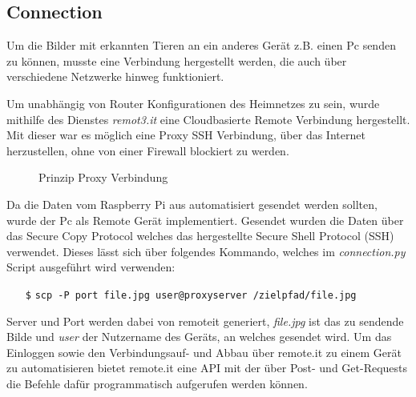 \subsection*{Connection}

Um die Bilder mit erkannten Tieren an ein anderes Gerät 
z.B. einen Pc senden zu können, musste eine Verbindung
hergestellt werden, die auch über verschiedene Netzwerke 
hinweg funktioniert.

Um unabhängig von Router Konfigurationen des Heimnetzes zu sein, 
wurde mithilfe des Dienstes \textit{remot3.it} \cite{remoteit}
eine Cloudbasierte Remote Verbindung hergestellt.
Mit dieser war es möglich eine Proxy SSH Verbindung, 
über das Internet herzustellen, ohne von einer Firewall 
blockiert zu werden.


\begin{figure}[H]
    \centering
    \def\svgwidth{0.7\textwidth}
    
    \caption{Prinzip Proxy Verbindung}
    \label{fig:remoteit}
\end{figure}

Da die Daten vom Raspberry Pi aus automatisiert gesendet 
werden sollten, wurde der Pc als Remote Gerät implementiert.
Gesendet wurden die Daten über das Secure Copy Protocol welches 
das hergestellte Secure Shell Protocol (SSH) verwendet.
Dieses lässt sich über folgendes Kommando,
welches im \textit{connection.py}
Script ausgeführt wird verwenden:
\begin{itemize}
    \item[\texttt{\$}] \texttt{scp -P port file.jpg user@proxyserver /zielpfad/file.jpg}
\end{itemize}

Server und Port werden dabei von remoteit generiert, \textit{file.jpg}
ist das zu sendende Bilde und \textit{user} der Nutzername des Geräts,
an welches gesendet wird.
Um das Einloggen sowie den Verbindungsauf- und Abbau 
über remote.it zu einem Gerät zu automatisieren
bietet remote.it eine API mit der über Post- und Get-Requests
die Befehle dafür programmatisch aufgerufen werden können.
